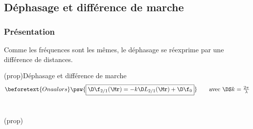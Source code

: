 \documentclass[../../main/main.tex]{subfiles}
\begin{document}

\subsection{Déphasage et différence de marche}
\subsubsection{Présentation}
Comme les fréquences sont les mêmes, le déphasage se réexprime par une
différence de distances.
\begin{tcb*}(prop){Déphasage et différence de marche}
	\vspace{-15pt}
	\begin{gather*}
		\beforetext{On a alors}
		\psw{\boxed{\D\f_{2/1}(\Mr) = -k\D L_{2/1}(\Mr) + \D\f_0}}
		\tag*{avec $\DS k = \frac{2\pi}{\lambda}$}
	\end{gather*}
	~
	\vspace{-15pt}
	\smallbreak
	\begin{isd}(prop)
		\psw{%
			\[
				\boxed{\Delta{L_{2/1}}(\Mr) = \SbMr - \SaMr}
			\]
		}%
		\vspace{-15pt}
		\tcblower
		\psw{%
			\[
				\boxed{\D\f_0 = \f_{02}-\f_{01}}
			\]
		}%
		\vspace{-15pt}
	\end{isd}
\end{tcb*}
\end{document}
